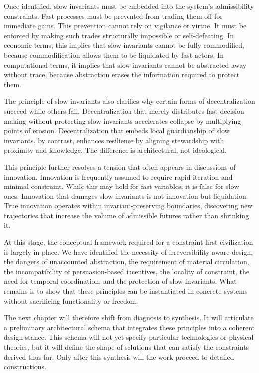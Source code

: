 \documentclass[12pt,oneside]{book}
\begin{document}
Once identified, slow invariants must be embedded into the system’s admissibility constraints. Fast processes must be prevented from trading them off for immediate gains. This prevention cannot rely on vigilance or virtue. It must be enforced by making such trades structurally impossible or self-defeating. In economic terms, this implies that slow invariants cannot be fully commodified, because commodification allows them to be liquidated by fast actors. In computational terms, it implies that slow invariants cannot be abstracted away without trace, because abstraction erases the information required to protect them.

The principle of slow invariants also clarifies why certain forms of decentralization succeed while others fail. Decentralization that merely distributes fast decision-making without protecting slow invariants accelerates collapse by multiplying points of erosion. Decentralization that embeds local guardianship of slow invariants, by contrast, enhances resilience by aligning stewardship with proximity and knowledge. The difference is architectural, not ideological.

This principle further resolves a tension that often appears in discussions of innovation. Innovation is frequently assumed to require rapid iteration and minimal constraint. While this may hold for fast variables, it is false for slow ones. Innovation that damages slow invariants is not innovation but liquidation. True innovation operates within invariant-preserving boundaries, discovering new trajectories that increase the volume of admissible futures rather than shrinking it.

At this stage, the conceptual framework required for a constraint-first civilization is largely in place. We have identified the necessity of irreversibility-aware design, the dangers of unaccounted abstraction, the requirement of material circulation, the incompatibility of persuasion-based incentives, the locality of constraint, the need for temporal coordination, and the protection of slow invariants. What remains is to show that these principles can be instantiated in concrete systems without sacrificing functionality or freedom.

The next chapter will therefore shift from diagnosis to synthesis. It will articulate a preliminary architectural schema that integrates these principles into a coherent design stance. This schema will not yet specify particular technologies or physical theories, but it will define the shape of solutions that can satisfy the constraints derived thus far. Only after this synthesis will the work proceed to detailed constructions.
\end{document}
